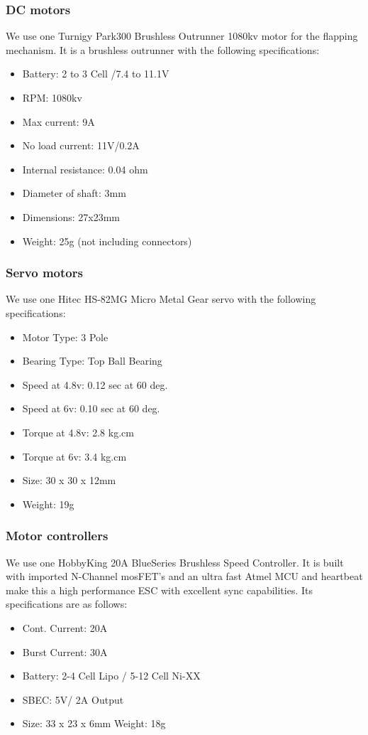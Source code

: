 \documentclass[a4paper, 10pt, twocolumn, titlepage]{article}
\begin{document}
\subsubsection{DC motors}
We use one Turnigy Park300 Brushless Outrunner 1080kv motor for the flapping mechanism.
It is a brushless outrunner with the following specifications:
\begin{itemize}
\itemsep-1mm
  \item Battery: 2 to 3 Cell /7.4 to 11.1V
  \item RPM: 1080kv
  \item Max current: 9A 
  \item No load current: 11V/0.2A
  \item Internal resistance: 0.04 ohm
  \item Diameter of shaft: 3mm
  \item Dimensions: 27x23mm
  \item Weight: 25g  (not including connectors)  
\end{itemize}

\subsubsection{Servo motors}
We use one Hitec HS-82MG Micro Metal Gear servo with the following specifications:
\begin{itemize}
\itemsep-1mm
  \item Motor Type:  3 Pole
  \item Bearing Type: Top Ball Bearing
  \item Speed at 4.8v:  0.12 sec at 60 deg.
  \item Speed at 6v:  0.10 sec at 60 deg.
  \item Torque at 4.8v:  2.8 kg.cm
  \item Torque at 6v:  3.4 kg.cm
  \item Size:  30 x 30 x 12mm
  \item Weight:  19g
\end{itemize}

\subsubsection{Motor controllers}
We use one HobbyKing 20A BlueSeries Brushless Speed Controller.
It is built with imported N-Channel mosFET's and an ultra fast Atmel MCU and heartbeat make this a high performance ESC with excellent sync capabilities. 
Its specifications are as follows:
\begin{itemize}
\itemsep-1mm
  \item Cont. Current: 20A
  \item Burst Current: 30A
  \item Battery: 2-4 Cell Lipo / 5-12 Cell Ni-XX
  \item SBEC: 5V/ 2A Output
  \item Size: 33 x 23 x 6mm
  Weight: 18g
\end{itemize}
\end{document}
